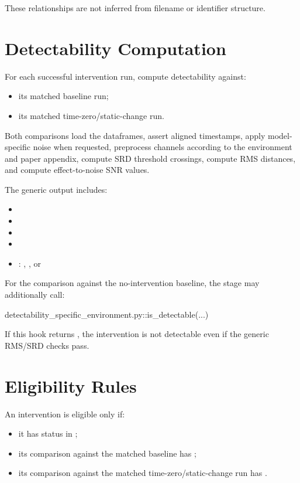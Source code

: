 \documentclass[11pt]{article}
\begin{document}
These relationships are not inferred from filename or identifier structure.

\section*{Detectability Computation}

For each successful intervention run, compute detectability against:

\begin{itemize}
\item its matched baseline run;
\item its matched time-zero/static-change run.
\end{itemize}

Both comparisons load the dataframes, assert aligned timestamps, apply model-specific noise when requested, preprocess channels according to the environment and paper appendix, compute SRD threshold crossings, compute RMS distances, and compute effect-to-noise SNR values.

The generic output includes:

\begin{itemize}
\item {}
\item {}
\item {}
\item {}
\item {}: , , or 
\end{itemize}

For the comparison against the no-intervention baseline, the stage may additionally call:

\begin{DocCode}
detectability_specific_environment.py::is_detectable(...)
\end{DocCode}

If this hook returns , the intervention is not detectable even if the generic RMS/SRD checks pass.

\section*{Eligibility Rules}

An intervention is eligible only if:

\begin{itemize}
\item it has status  in ;
\item its comparison against the matched baseline has ;
\item its comparison against the matched time-zero/static-change run has .
\end{itemize}
\end{document}
